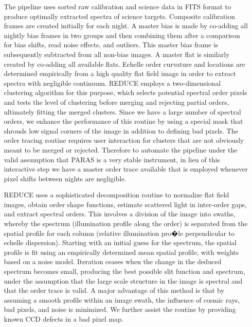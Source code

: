 \documentclass[12pt,preprint]{emulateapj}
\begin{document}
The pipeline uses sorted raw calibration and science data in FITS format to produce optimally extracted spectra of science targets. Composite calibration frames are created initially for each night. A master bias is made by co-adding all nightly bias frames in two groups and then combining them after a comparison for bias shifts, read noise effects, and outliers. This master bias frame is subsequently subtracted from all non-bias images. A master flat is similarly created by co-adding all available flats. Echelle order curvature and locations are determined empirically from a high quality flat field image in order to extract spectra with negligible continuum. REDUCE employs a two-dimensional clustering algorithm for this purpose, which selects potential spectral order pixels and tests the level of clustering before merging and rejecting partial orders, ultimately fitting the merged clusters. Since we have a large number of spectral orders, we enhance the performance of this routine by using a special mask that shrouds low signal corners of the image in addition to defining bad pixels. The order tracing routine requires user interaction for clusters that are not obviously meant to be merged or rejected. Therefore to automate the pipeline under the valid assumption that PARAS is a very stable instrument, in lieu of this interactive step we have a master order trace available that is employed whenever pixel shifts between nights are negligible. 

REDUCE uses a sophisticated decomposition routine to normalize flat field images, obtain order shape functions, estimate scattered light in inter-order gaps, and extract spectral orders. This involves a division of the image into swaths, whereby the spectrum (illumination profile along the order) is separated from the spatial profile for each column (relative illumination pro�le perpendicular to echelle dispersion). Starting with an initial guess for the spectrum, the spatial profile is fit using an empirically determined mean spatial profile, with weights based on a noise model. Iteration ceases when the change in the deduced spectrum becomes small, producing the best possible slit function and spectrum, under the assumption that the large scale structure in the image is spectral and that the order trace is valid. A major advantage of this method is that by assuming a smooth profile within an image swath, the influence of cosmic rays, bad pixels, and noise is minimized. We further assist the routine by providing known CCD defects in a bad pixel map.   
\end{document}
